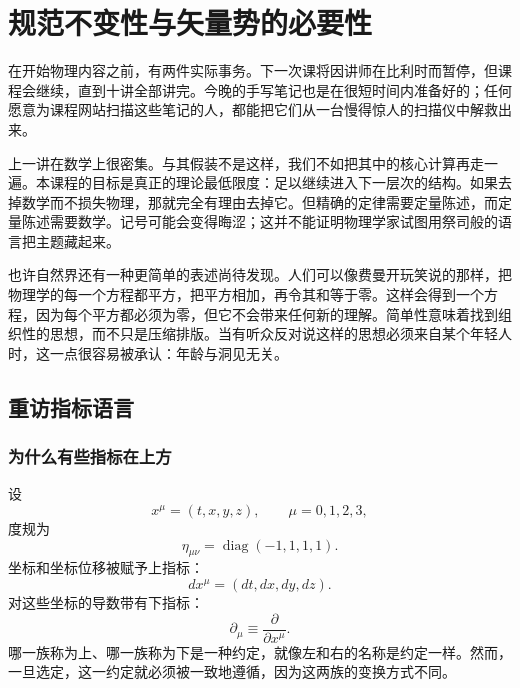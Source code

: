 \chapter{规范不变性与矢量势的必要性}

在开始物理内容之前，有两件实际事务。下一次课将因讲师在比利时而暂停，但课程会继续，直到十讲全部讲完。今晚的手写笔记也是在很短时间内准备好的；任何愿意为课程网站扫描这些笔记的人，都能把它们从一台慢得惊人的扫描仪中解救出来。

上一讲在数学上很密集。与其假装不是这样，我们不如把其中的核心计算再走一遍。本课程的目标是真正的理论最低限度：足以继续进入下一层次的结构。如果去掉数学而不损失物理，那就完全有理由去掉它。但精确的定律需要定量陈述，而定量陈述需要数学。记号可能会变得晦涩；这并不能证明物理学家试图用祭司般的语言把主题藏起来。

也许自然界还有一种更简单的表述尚待发现。人们可以像费曼开玩笑说的那样，把物理学的每一个方程都平方，把平方相加，再令其和等于零。这样会得到一个方程，因为每个平方都必须为零，但它不会带来任何新的理解。简单性意味着找到组织性的思想，而不只是压缩排版。当有听众反对说这样的思想必须来自某个年轻人时，这一点很容易被承认：年龄与洞见无关。


\section{重访指标语言}

\subsection{为什么有些指标在上方}

设
\begin{equation}
x^\mu=(t,x,y,z),
\qquad
\mu=0,1,2,3,
\end{equation}
度规为
\begin{equation}
\eta_{\mu\nu}
=
\operatorname{diag}(-1,1,1,1).
\label{eq:sr7-metric}
\end{equation}
坐标和坐标位移被赋予上指标：
\begin{equation}
dx^\mu=(dt,dx,dy,dz).
\end{equation}
对这些坐标的导数带有下指标：
\begin{equation}
\partial_\mu
\equiv
\frac{\partial}{\partial x^\mu}.
\label{eq:sr7-gradient}
\end{equation}
哪一族称为上、哪一族称为下是一种约定，就像左和右的名称是约定一样。然而，一旦选定，这一约定就必须被一致地遵循，因为这两族的变换方式不同。

